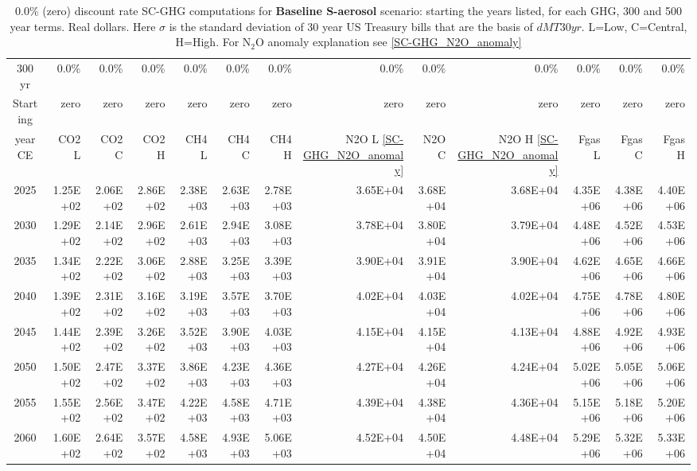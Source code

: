 \documentclass{article}
\begin{document}
\begin{table}
     \caption{0.0\% (zero) discount rate  SC-GHG computations for \textbf{Baseline S-aerosol} scenario: starting the years listed, for each GHG, 300 and 500 year terms. Real dollars. Here $\sigma$ is the standard deviation of 30 year US Treasury bills that are the basis of $dMT30yr$. L=Low, C=Central, H=High. For N$_2$O anomaly explanation see \ref{SC-GHG_N2O_anomaly}} 
\label{PVs_300_yearSCC_BH0.0}
\small
\begin{tabular}{crrr|rrr|rrr|rrr}
300 yr   & 0.0\%    & 0.0\%    & 0.0\%    & 0.0\%    & 0.0\%    & 0.0\%    & 0.0\%    & 0.0\%    & 0.0\%    & 0.0\%    & 0.0\%    & 0.0\%    \\
Starting & zero     & zero     & zero     & zero     & zero     & zero     & zero     & zero     & zero     & zero     & zero     & zero     \\
year CE  & CO2 L    & CO2 C    & CO2 H    & CH4 L    & CH4 C    & CH4 H    & N2O L \ref{SC-GHG_N2O_anomaly}     & N2O C      & N2O H \ref{SC-GHG_N2O_anomaly}    & Fgas L   & Fgas C   & Fgas H   \\
2025     & 1.25E+02 & 2.06E+02 & 2.86E+02 & 2.38E+03 & 2.63E+03 & 2.78E+03 & 3.65E+04 & 3.68E+04 & 3.68E+04 & 4.35E+06 & 4.38E+06 & 4.40E+06 \\
2030     & 1.29E+02 & 2.14E+02 & 2.96E+02 & 2.61E+03 & 2.94E+03 & 3.08E+03 & 3.78E+04 & 3.80E+04 & 3.79E+04 & 4.48E+06 & 4.52E+06 & 4.53E+06 \\
2035     & 1.34E+02 & 2.22E+02 & 3.06E+02 & 2.88E+03 & 3.25E+03 & 3.39E+03 & 3.90E+04 & 3.91E+04 & 3.90E+04 & 4.62E+06 & 4.65E+06 & 4.66E+06 \\
2040     & 1.39E+02 & 2.31E+02 & 3.16E+02 & 3.19E+03 & 3.57E+03 & 3.70E+03 & 4.02E+04 & 4.03E+04 & 4.02E+04 & 4.75E+06 & 4.78E+06 & 4.80E+06 \\
2045     & 1.44E+02 & 2.39E+02 & 3.26E+02 & 3.52E+03 & 3.90E+03 & 4.03E+03 & 4.15E+04 & 4.15E+04 & 4.13E+04 & 4.88E+06 & 4.92E+06 & 4.93E+06 \\
2050     & 1.50E+02 & 2.47E+02 & 3.37E+02 & 3.86E+03 & 4.23E+03 & 4.36E+03 & 4.27E+04 & 4.26E+04 & 4.24E+04 & 5.02E+06 & 5.05E+06 & 5.06E+06 \\
2055     & 1.55E+02 & 2.56E+02 & 3.47E+02 & 4.22E+03 & 4.58E+03 & 4.71E+03 & 4.39E+04 & 4.38E+04 & 4.36E+04 & 5.15E+06 & 5.18E+06 & 5.20E+06 \\
2060     & 1.60E+02 & 2.64E+02 & 3.57E+02 & 4.58E+03 & 4.93E+03 & 5.06E+03 & 4.52E+04 & 4.50E+04 & 4.48E+04 & 5.29E+06 & 5.32E+06 & 5.33E+06 \\

\end{tabular}
\end{table}
\end{document}
